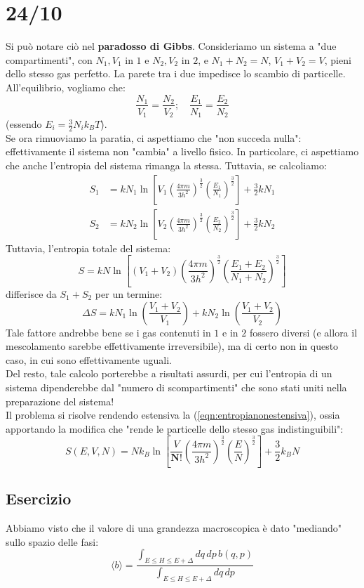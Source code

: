 \documentclass[../MeccanicaStatistica.tex]{subfiles}
\begin{document}
\section{24/10}
Si può notare ciò nel \textbf{paradosso di Gibbs}. Consideriamo un sistema a "due compartimenti", con $N_1,V_1$ in $1$ e $N_2,V_2$ in $2$, e $N_1+N_2=N$, $V_1+V_2=V$, pieni dello stesso gas perfetto. La parete tra i due impedisce lo scambio di particelle.\\
All'equilibrio, vogliamo che:
\[
\frac{N_1}{V_1} = \frac{N_2}{V_2}; \quad \frac{E_1}{N_1}=\frac{E_2}{N_2}
\]
(essendo $E_i = \frac{3}{2}N_i k_B T$).\\
Se ora rimuoviamo la paratia, ci aspettiamo che "non succeda nulla": effettivamente il sistema non "cambia" a livello fisico. In particolare, ci aspettiamo che anche l'entropia del sistema rimanga la stessa. Tuttavia, se calcoliamo:
\begin{align*}
S_1 &= k N_1 \ln\left[V_1 \left(\frac{4\pi m}{3h^2}\right)^\frac{3}{2}\left(\frac{E_1}{N_1}\right)^\frac{3}{2}\right]+\frac{3}{2}kN_1\\
S_2 &= k N_2 \ln\left[V_2 \left(\frac{4\pi m}{3h^2}\right)^\frac{3}{2}\left(\frac{E_2}{N_2}\right)^\frac{3}{2}\right]+\frac{3}{2}kN_2
\end{align*}
Tuttavia, l'entropia totale del sistema:
\[
S=kN\ln\left[(V_1+V_2)\left(\frac{4\pi m}{3h^2}\right)^\frac{3}{2}\left(\frac{E_1+E_2}{N_1+N_2}\right)^\frac{3}{2}\right]
\]
differisce da $S_1 + S_2$ per un termine:
\[
\Delta S = kN_1\ln\left(\frac{V_1+V_2}{V_1}\right)+kN_2\ln\left(\frac{V_1+V_2}{V_2}\right)
\]
Tale fattore andrebbe bene se i gas contenuti in $1$ e in $2$ fossero diversi (e allora il mescolamento sarebbe effettivamente irreversibile), ma di certo non in questo caso, in cui sono effettivamente uguali.\\
Del resto, tale calcolo porterebbe a risultati assurdi, per cui l'entropia di un sistema dipenderebbe dal "numero di scompartimenti" che sono stati uniti nella preparazione del sistema!\\
Il problema si risolve rendendo estensiva la (\ref{eqn:entropianonestensiva}), ossia apportando la modifica che "rende le particelle dello stesso gas indistinguibili":
\[
S(E,V,N) = Nk_B \ln\left[\frac{V}{\bm{N!}}\left(\frac{4\pi m}{3h^2}\right)^\frac{3}{2}\left(\frac{E}{N}\right)^\frac{3}{2}\right]+\frac{3}{2}k_B N
\]

\subsection{Esercizio}
Abbiamo visto che il valore di una grandezza macroscopica è dato "mediando" sullo spazio delle fasi:
\[
\langle b\rangle = \frac{\displaystyle \int_{E\leq H\leq E+\Delta}dq\,dp\,b(q,p)}{\displaystyle \int_{E\leq H\leq E+\Delta}dq\,dp}
\]
\end{document}
